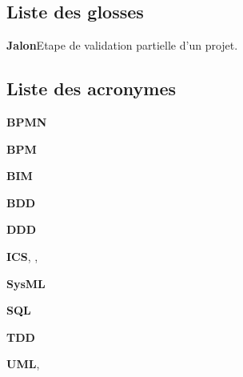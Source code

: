 \documentclass[a4paper,12pt]{article}
\begin{document}
\subsection{Liste des glosses}
\label{sec:org35ec10a}
\textbf{\hypertarget{gls-25}{Jalon}}\hspace*{1em}Etape de validation partielle d'un projet.\hspace*{.5em}\pageref{gls-2-use-1}
\subsection{Liste des acronymes}
\label{sec:orgc6f7418}
\textbf{\hypertarget{gls-80}{BPMN}}\hspace*{1em}\hspace*{.5em}\pageref{gls-9-use-1}

\textbf{\hypertarget{gls-79}{BPM}}\hspace*{1em}\hspace*{.5em}\pageref{gls-8-use-1}

\textbf{\hypertarget{gls-71}{BIM}}\hspace*{1em}\hspace*{.5em}\pageref{gls-1-use-1}

\textbf{\hypertarget{gls-69}{BDD}}\hspace*{1em}\hspace*{.5em}\pageref{gls-5-use-1}

\textbf{\hypertarget{gls-121}{DDD}}\hspace*{1em}\hspace*{.5em}\pageref{gls-7-use-1}

\textbf{\hypertarget{gls-185}{ICS}}\hspace*{1em}\hspace*{.5em}\pageref{gls-11-use-1}, \pageref{gls-11-use-2}, \pageref{gls-11-use-3}

\textbf{\hypertarget{gls-330}{SysML}}\hspace*{1em}\hspace*{.5em}\pageref{gls-10-use-1}

\textbf{\hypertarget{gls-322}{SQL}}\hspace*{1em}\hspace*{.5em}\pageref{gls-4-use-1}

\textbf{\hypertarget{gls-332}{TDD}}\hspace*{1em}\hspace*{.5em}\pageref{gls-6-use-1}

\textbf{\hypertarget{gls-337}{UML}}\hspace*{1em}\hspace*{.5em}\pageref{gls-3-use-1}, \pageref{gls-3-use-2}
\end{document}
